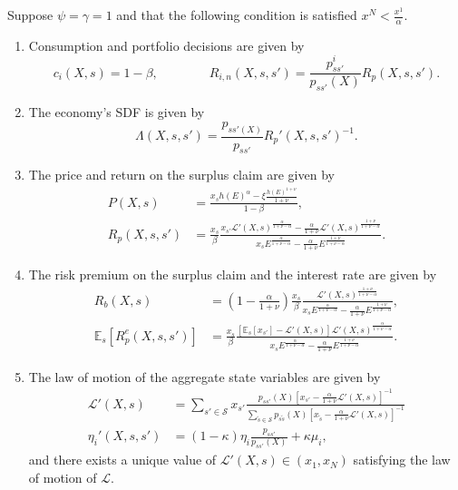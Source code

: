 \begin{proposition}\label{oa_log_utility} Suppose $\psi = \gamma = 1$ and that the following condition is satisfied $x^N < \frac{x^1}{\alpha}$.

\begin{enumerate}
    \item Consumption and portfolio decisions are given by
    \begin{equation}
        c_i(X,s) = 1-\beta, \qquad \qquad R_{i,n}(X,s,s') = \frac{p_{ss'}^i}{p_{ss'}(X)} R_p(X,s,s').
    \end{equation}
    \item The economy's SDF is given by
    \begin{equation}
        \Lambda(X,s,s') = \frac{p_{ss'(X)}}{p_{ss'}} R_p'(X,s,s')^{-1}.
    \end{equation}
    \item The price and return on the surplus claim are given by
    \begin{align}
        P(X,s) &= \frac{x_s h(E)^\alpha - \xi \frac{h(E)^{1+\nu}}{1+\nu}}{1-\beta}, \\
        R_p(X,s,s') &= \frac{x_s}{\beta} \frac{x_{s'} \mathcal{L}'(X,s)^\frac{\alpha}{1+\nu-\alpha} -\frac{ \alpha}{1+\nu} \mathcal{L}'(X,s)^{\frac{1+\nu}{1+\nu-\alpha}}}{x_{s} E^\frac{\alpha}{1+\nu-\alpha} -\frac{ \alpha}{1+\nu} E^{\frac{1+\nu}{1+\nu-\alpha}}}.
    \end{align}
    \item The risk premium on the surplus claim and the interest rate are given by
    \begin{align}
        R_b(X,s) &= \left(1 - \frac{\alpha}{1+\nu} \right) \frac{x_s}{\beta} \frac{  \mathcal{L}'(X,s)^{\frac{1+\nu}{1+\nu-\alpha}}}{x_{s} E^\frac{\alpha}{1+\nu-\alpha} -\frac{ \alpha}{1+\nu} E^{\frac{1+\nu}{1+\nu-\alpha}}},\\
        \mathbb{E}_s[R_p^e(X,s,s')] &= \frac{x_s}{\beta} \frac{[\mathbb{E}_s[x_{s'}]-\mathcal{L}'(X,s)] \mathcal{L}'(X,s)^\frac{\alpha}{1+\nu-\alpha} }{x_{s} E^\frac{\alpha}{1+\nu-\alpha} -\frac{ \alpha}{1+\nu} E^{\frac{1+\nu}{1+\nu-\alpha}}}.
    \end{align}
    
\item The law of motion of the aggregate state variables are given by
\begin{align}
    \mathcal{L}'(X,s) &= \sum_{s'\in \mathcal{S}} x_{s'} \frac{p_{ss'}(X) \left[x_{s'} -\frac{ \alpha}{1+\nu} \mathcal{L}'(X,s) \right]^{-1}}{\sum_{\tilde{s}\in \mathcal{S}} p_{s\tilde{s}}(X)\left[x_{\tilde{s}} -\frac{ \alpha}{1+\nu} \mathcal{L}'(X,s) \right]^{-1}}\\
    \eta_i'(X,s,s') &= (1-\kappa) \eta_i \frac{p_{ss'}}{p_{ss'}(X)} + \kappa \mu_i,
\end{align}
and there exists a unique value of $\mathcal{L}'(X,s) \in (x_1,x_N)$ satisfying the law of motion of $\mathcal{L}$.
\end{enumerate}
\end{proposition}

